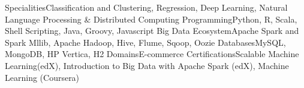 \begin{cvskills}
\cvskill
{Specialities}{Classification and Clustering, Regression, Deep Learning, Natural Language Processing \& Distributed Computing}
\cvskill
{Programming}{Python, R, Scala, Shell Scripting, Java, Groovy, Javascript}
\cvskill
{Big Data Ecosystem}{Apache Spark and Spark Mllib, Apache Hadoop, Hive, Flume, Sqoop, Oozie}
\cvskill
{Databases}{MySQL, MongoDB, HP Vertica, H2}
\cvskill
{Domains}{E-commerce}
\cvskill
{Certifications}{Scalable Machine Learning(edX), Introduction to Big Data with Apache Spark (edX), Machine Learning (Coursera)}
\end{cvskills}

